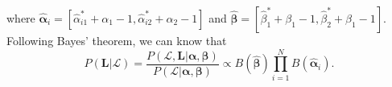 \documentclass{article}
\begin{document}
where $\hat{\bm{\alpha}}_i=[\hat{\alpha}^{*}_{i1}+\alpha_1-1,\hat{\alpha}^{*}_{i2}+\alpha_2-1]$ and $\hat{\bm{\beta}}=[\hat{\beta}^{*}_1+\beta_1-1,\hat{\beta}^{*}_2+\beta_1-1]$. Following Bayes' theorem, we can know that
\begin{equation}
\label{PostDist}
P(\bm{L}|\mathcal{L})=\frac{P(\mathcal{L},\bm{L}|\bm{\alpha}, \bm{\beta})}{P(\mathcal{L}|\bm{\alpha}, \bm{\beta})}\propto B(\hat{\bm{\beta}})\prod_{i=1}^{N}B(\hat{\bm{\alpha}}_{i}). 
\end{equation}




\end{document}
